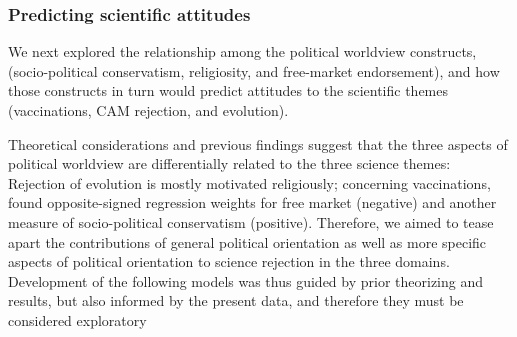 \documentclass[fignum,man]{apa}\usepackage[]{graphicx}\usepackage[]{color}
\begin{document}
\subsubsection{Predicting scientific attitudes}

We next explored the relationship among the political worldview constructs,
(socio-political conservatism, religiosity, and free-market endorsement), and how those constructs
in turn would predict attitudes to the scientific themes (vaccinations, CAM rejection, and
evolution). 

Theoretical considerations and previous findings suggest that the 
three aspects of political worldview are differentially related to the three science themes: 
Rejection of evolution is mostly motivated religiously; 
concerning vaccinations,  found opposite-signed regression weights for free market (negative) 
and another measure of socio-political conservatism (positive). 
Therefore, we aimed to tease apart the contributions of general political orientation as well as more specific aspects of political orientation to science rejection in the three domains. 
Development of the following models was thus guided by prior theorizing and results, 
but also informed by the present data, and therefore they must be considered exploratory
\end{document}
